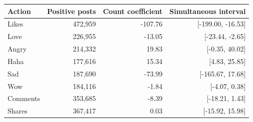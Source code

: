 \begin{tabular}{lrrr}
\toprule
Action & Positive posts & Count coefficient & Simultaneous interval \\
\midrule
Likes & 472,959 & -107.76 & [-199.00, -16.53] \\
Love & 226,955 & -13.05 & [-23.44, -2.65] \\
Angry & 214,332 & 19.83 & [-0.35, 40.02] \\
Haha & 177,616 & 15.34 & [4.83, 25.85] \\
Sad & 187,690 & -73.99 & [-165.67, 17.68] \\
Wow & 184,116 & -1.84 & [-4.07, 0.38] \\
Comments & 353,685 & -8.39 & [-18.21, 1.43] \\
Shares & 367,417 & 0.03 & [-15.92, 15.98] \\
\bottomrule
\end{tabular}
